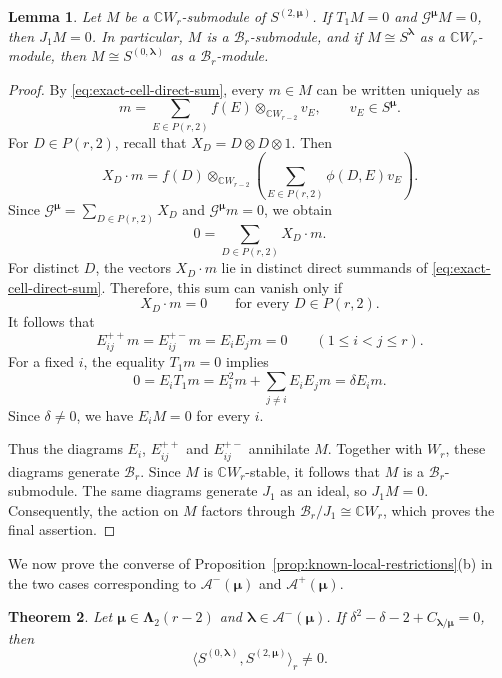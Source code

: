 \documentclass[10pt,a4paper]{amsart}
\newtheorem{theorem}{Theorem}[section]
\newtheorem{lemma}[theorem]{Lemma}
\newcommand{\C}{\mathbb{C}}
\newcommand{\1}{\mathfrak{1}}
\newcommand{\B}{\mathcal{B}}
\begin{document}
\begin{lemma}\label{lem:exact-top-layer-copy}
Let $M$ be a $\C W_r$-submodule of $S^{(2,\bm\mu)}$. If $T_1M=0$ and $\mathcal G^{\bm\mu}M=0$, then $J_1M=0$. In particular, $M$ is a $\B_r$-submodule, and if $M\cong S^{\bm\lambda}$ as a $\C W_r$-module, then $M\cong S^{(0,\bm\lambda)}$ as a $\B_r$-module.
\end{lemma}

\begin{proof}
By \eqref{eq:exact-cell-direct-sum}, every $m\in M$
can be written uniquely as
$$
m=\sum_{E\in P(r,2)}
f(E)\otimes_{\C W_{r-2}}v_E,
\qquad v_E\in S^{\bm\mu}.
$$
For $D\in P(r,2)$, recall that
$X_D=D\otimes D\otimes1$. Then
$$
X_D\cdot m
=
f(D)\otimes_{\C W_{r-2}}
\left(
\sum_{E\in P(r,2)}\phi(D,E)v_E
\right).
$$
Since $\mathcal G^{\bm\mu}=\sum_{D\in P(r,2)}X_D$
and $\mathcal G^{\bm\mu}m=0$, we obtain
$$
0=\sum_{D\in P(r,2)}X_D\cdot m.
$$
For distinct $D$, the vectors $X_D\cdot m$ lie in
distinct direct summands of
\eqref{eq:exact-cell-direct-sum}. Therefore, this
sum can vanish only if
$$
X_D\cdot m=0
\qquad\text{for every }D\in P(r,2).
$$
It follows that
$$
E_{ij}^{++}m=E_{ij}^{+-}m=E_iE_jm=0
\qquad(1\leq i<j\leq r).
$$
For a fixed $i$, the equality $T_1m=0$ implies
$$
0=E_iT_1m
=E_i^2m+\sum_{j\neq i}E_iE_jm
=\delta E_im.
$$
Since $\delta\neq0$, we have $E_iM=0$ for every $i$.

Thus the diagrams $E_i$, $E_{ij}^{++}$ and $E_{ij}^{+-}$ annihilate $M$. Together with $W_r$, these diagrams generate $\B_r$. Since $M$ is $\C W_r$-stable, it follows that $M$ is a $\B_r$-submodule.
The same diagrams generate $J_1$ as an ideal, so $J_1M=0$. Consequently, the action on $M$ factors through $\B_r/J_1\cong\C W_r$, which proves the final assertion.
\end{proof}

We now prove the converse of
Proposition~\ref{prop:known-local-restrictions}(b)
in the two cases corresponding to
$\mathcal A^-(\bm\mu)$ and $\mathcal A^+(\bm\mu)$.

\begin{theorem}\label{thm:exact-converse-minus}
Let $\bm\mu\in\bm\Lambda_2(r-2)$ and
$\bm\lambda\in\mathcal A^-(\bm\mu)$.
If $\delta^2-\delta-2+C_{\bm\lambda/\bm\mu}=0$, then
$$
\langle S^{(0,\bm\lambda)},
S^{(2,\bm\mu)}\rangle_r\neq0.
$$
\end{theorem}
\end{document}
